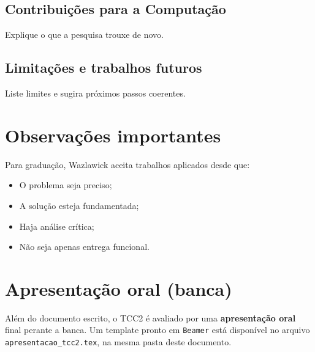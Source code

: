 \documentclass[
    12pt,                %
    openright,           %
    oneside,             %
    a4paper,             %
    english,             %
    brazil               %
]{abntex2}
\begin{document}
\section{Contribuições para a Computação}
Explique o que a pesquisa trouxe de novo.

\section{Limitações e trabalhos futuros}
Liste limites e sugira próximos passos coerentes.

\chapter*{Observações importantes}

Para graduação, Wazlawick aceita trabalhos aplicados desde que:
\begin{itemize}
    \item O problema seja preciso;
    \item A solução esteja fundamentada;
    \item Haja análise crítica;
    \item Não seja apenas entrega funcional.
\end{itemize}

\chapter*{Apresentação oral (banca)}

Além do documento escrito, o TCC2 é avaliado por uma \textbf{apresentação oral} final perante a banca. Um template pronto em \texttt{Beamer} está disponível no arquivo \texttt{apresentacao\_tcc2.tex}, na mesma pasta deste documento.
\end{document}
